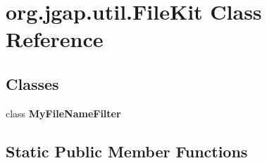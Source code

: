 \hypertarget{classorg_1_1jgap_1_1util_1_1_file_kit}{\section{org.\-jgap.\-util.\-File\-Kit Class Reference}
\label{classorg_1_1jgap_1_1util_1_1_file_kit}
}
\subsection*{Classes}
\begin{DoxyCompactItemize}
\item 
class {\bfseries My\-File\-Name\-Filter}
\end{DoxyCompactItemize}
\subsection*{Static Public Member Functions}
